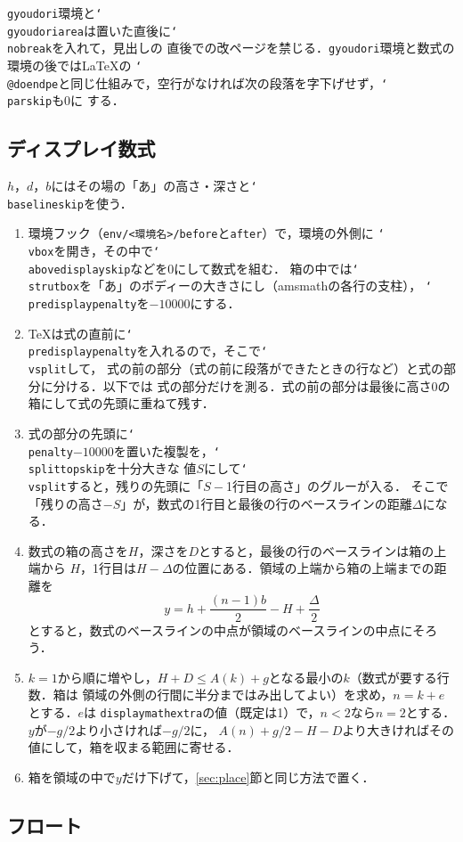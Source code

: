 \documentclass[paper=a4,dvipdfmx]{jlreq}
\newcommand\pkg[1]{\textsf{#1}}
\newcommand\opt[1]{\texttt{#1}}
\newcommand\env[1]{\texttt{#1}}
\newcommand\cs[1]{\texttt{\char`\\#1}}
\begin{document}
\env{gyoudori}環境と\cs{gyoudoriarea}は置いた直後に\cs{nobreak}を入れて，見出しの
直後での改ページを禁じる．\env{gyoudori}環境と数式の環境の後では\LaTeX{}の
\cs{@doendpe}と同じ仕組みで，空行がなければ次の段落を字下げせず，\cs{parskip}も0に
する．

\subsection{ディスプレイ数式}
\label{sec:math}

$h$，$d$，$b$にはその場の「あ」の高さ・深さと\cs{baselineskip}を使う．
\begin{enumerate}
\item 環境フック（\texttt{env/<環境名>/before}と\texttt{after}）で，環境の外側に
  \cs{vbox}を開き，その中で\cs{abovedisplayskip}などを0にして数式を組む．
  箱の中では\cs{strutbox}を「あ」のボディーの大きさにし（\pkg{amsmath}の各行の支柱），
  \cs{predisplaypenalty}を$-10000$にする．
\item \TeX{}は式の直前に\cs{predisplaypenalty}を入れるので，そこで\cs{vsplit}して，
  式の前の部分（式の前に段落ができたときの行など）と式の部分に分ける．以下では
  式の部分だけを測る．式の前の部分は最後に高さ0の箱にして式の先頭に重ねて残す．
\item 式の部分の先頭に\cs{penalty}$-10000$を置いた複製を，\cs{splittopskip}を十分大きな
  値$S$にして\cs{vsplit}すると，残りの先頭に「$S-{}$1行目の高さ」のグルーが入る．
  そこで「残りの高さ$-S$」が，数式の1行目と最後の行のベースラインの距離$\Delta$になる．
\item 数式の箱の高さを$H$，深さを$D$とすると，最後の行のベースラインは箱の上端から
  $H$，1行目は$H-\Delta$の位置にある．領域の上端から箱の上端までの距離を
  \[ y = h + \frac{(n-1)b}{2} - H + \frac{\Delta}{2} \]
  とすると，数式のベースラインの中点が領域のベースラインの中点にそろう．
\item $k=1$から順に増やし，$H+D\le A(k)+g$となる最小の$k$（数式が要する行数．箱は
  領域の外側の行間に半分まではみ出してよい）を求め，$n=k+e$とする．$e$は
  \opt{displaymathextra}の値（既定は1）で，$n<2$なら$n=2$とする．$y$が$-g/2$より小さければ$-g/2$に，
  $A(n)+g/2-H-D$より大きければその値にして，箱を収まる範囲に寄せる．
\item 箱を領域の中で$y$だけ下げて，\ref{sec:place}\nobreak 節と同じ方法で置く．
\end{enumerate}

\subsection{フロート}
\label{sec:float-impl}
\end{document}
